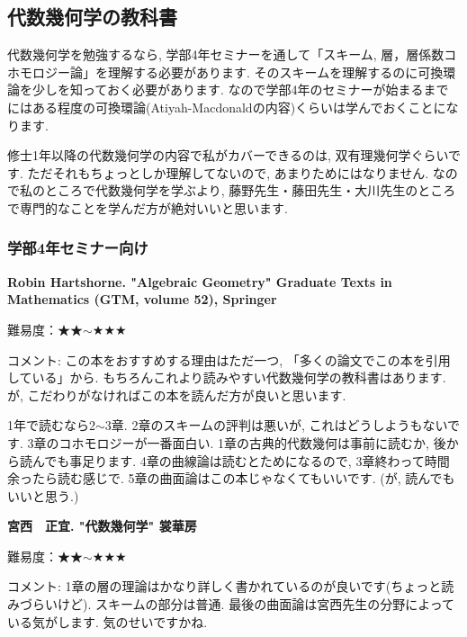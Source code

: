 \subsection{代数幾何学の教科書}

代数幾何学を勉強するなら, 学部4年セミナーを通して「スキーム, 層，層係数コホモロジー論」を理解する必要があります. そのスキームを理解するのに可換環論を少しを知っておく必要があります. 
なので学部4年のセミナーが始まるまでにはある程度の可換環論(Atiyah-Macdonaldの内容)くらいは学んでおくことになります. 

修士1年以降の代数幾何学の内容で私がカバーできるのは, 双有理幾何学ぐらいです.
ただそれもちょっとしか理解してないので, あまりためにはなりません. 
なので私のところで代数幾何学を学ぶより, 藤野先生・藤田先生・大川先生のところで専門的なことを学んだ方が絶対いいと思います. 

\subsubsection{学部4年セミナー向け}

\textbf{Robin Hartshorne. "Algebraic Geometry" Graduate Texts in Mathematics (GTM, volume 52), Springer} \vspace{-6pt}

難易度：★★$\sim$★★★  \vspace{-6pt}

コメント: この本をおすすめする理由はただ一つ, 「多くの論文でこの本を引用している」から.  もちろんこれより読みやすい代数幾何学の教科書はあります. が, こだわりがなければこの本を読んだ方が良いと思います. 

1年で読むなら2$\sim$3章. 2章のスキームの評判は悪いが, これはどうしようもないです. 3章のコホモロジーが一番面白い. 
1章の古典的代数幾何は事前に読むか, 後から読んでも事足ります. 
4章の曲線論は読むとためになるので, 3章終わって時間余ったら読む感じで. 
5章の曲面論はこの本じゃなくてもいいです. (が, 読んでもいいと思う.)
\vspace{8pt}

\textbf{宮西　正宜. "代数幾何学" 裳華房}  \vspace{-6pt}

難易度：★★$\sim$★★★  \vspace{-6pt}
 
コメント: 1章の層の理論はかなり詳しく書かれているのが良いです(ちょっと読みづらいけど). スキームの部分は普通. 最後の曲面論は宮西先生の分野によっている気がします. 気のせいですかね. 
\vspace{8pt}

